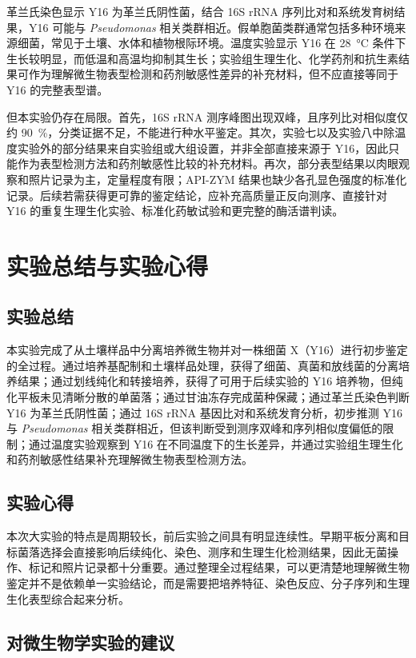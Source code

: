 \documentclass[UTF8,a4paper,12pt,fontset=none]{ctexart}
\numberwithin{figure}{section}
\begin{document}
革兰氏染色显示 Y16 为革兰氏阴性菌，结合 16S rRNA 序列比对和系统发育树结果，Y16 可能与 \textit{Pseudomonas} 相关类群相近。假单胞菌类群通常包括多种环境来源细菌，常见于土壤、水体和植物根际环境。温度实验显示 Y16 在 \SI{28}{\celsius} 条件下生长较明显，而低温和高温均抑制其生长；实验组生理生化、化学药剂和抗生素结果可作为理解微生物表型检测和药剂敏感性差异的补充材料，但不应直接等同于 Y16 的完整表型谱。

但本实验仍存在局限。首先，16S rRNA 测序峰图出现双峰，且序列比对相似度仅约 \SI{90}{\percent}，分类证据不足，不能进行种水平鉴定。其次，实验七以及实验八中除温度实验外的部分结果来自实验组或大组设置，并非全部直接来源于 Y16，因此只能作为表型检测方法和药剂敏感性比较的补充材料。再次，部分表型结果以肉眼观察和照片记录为主，定量程度有限；API-ZYM 结果也缺少各孔显色强度的标准化记录。后续若需获得更可靠的鉴定结论，应补充高质量正反向测序、直接针对 Y16 的重复生理生化实验、标准化药敏试验和更完整的酶活谱判读。

\section{实验总结与实验心得}

\subsection{实验总结}

本实验完成了从土壤样品中分离培养微生物并对一株细菌 X（Y16）进行初步鉴定的全过程。通过培养基配制和土壤样品处理，获得了细菌、真菌和放线菌的分离培养结果；通过划线纯化和转接培养，获得了可用于后续实验的 Y16 培养物，但纯化平板未见清晰分散的单菌落；通过甘油冻存完成菌种保藏；通过革兰氏染色判断 Y16 为革兰氏阴性菌；通过 16S rRNA 基因比对和系统发育分析，初步推测 Y16 与 \textit{Pseudomonas} 相关类群相近，但该判断受到测序双峰和序列相似度偏低的限制；通过温度实验观察到 Y16 在不同温度下的生长差异，并通过实验组生理生化和药剂敏感性结果补充理解微生物表型检测方法。

\subsection{实验心得}

本次大实验的特点是周期较长，前后实验之间具有明显连续性。早期平板分离和目标菌落选择会直接影响后续纯化、染色、测序和生理生化检测结果，因此无菌操作、标记和照片记录都十分重要。通过整理全过程结果，可以更清楚地理解微生物鉴定并不是依赖单一实验结论，而是需要把培养特征、染色反应、分子序列和生理生化表型综合起来分析。

\subsection{对微生物学实验的建议}
\end{document}
